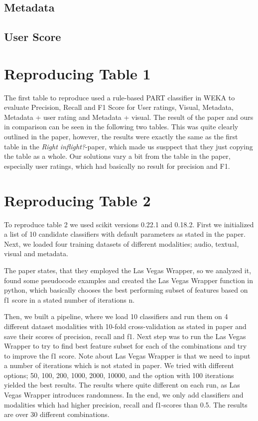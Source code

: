 \documentclass[sigconf]{acmart}
\begin{document}
\subsection{Metadata}

\subsection{User Score}

\newpage
\section{Reproducing Table 1}
The first table to reproduce used a rule-based PART classifier in WEKA to evaluate Precision, Recall and F1 Score for User ratings, Visual, Metadata, Metadata + user rating and Metadata + visual. The result of the paper and ours in comparison can be seen in the following two tables. This was quite clearly outlined in the paper, however, the results were exactly the same as the first table in the \textit{Right inflight?}-paper, which made us susppect that they just copying the table as a whole. Our solutions vary a bit from the table in the paper, especially user ratings, which had basically no result for precision and F1.


\section{Reproducing Table 2}
To reproduce table 2 we used scikit versions 0.22.1 and 0.18.2. First we initialized a list of 10 candidate classifiers with default parameters as stated in the paper. Next, we loaded four training datasets of different modalities; audio, textual, visual and metadata.

The paper states, that they employed the Las Vegas Wrapper, so we analyzed it, found some pseudocode examples and created the Las Vegas Wrapper function in python, which basically chooses the best performing subset of features based on f1 score in a stated number of iterations n.

Then, we built a pipeline, where we load 10 classifiers and run them on 4 different dataset modalities with 10-fold cross-validation as stated in paper and save their scores of precision, recall and f1. Next step was to run the Las Vegas Wrapper to try to find best feature subset for each of the combinations and try to improve the f1 score. Note about Las Vegas Wrapper is that we need to input a number of iterations which is not stated in paper. We tried with different options; 50, 100,  200, 1000, 2000, 10000, and the option with 100 iterations yielded the best results. The results where quite different on each run, as Las Vegas Wrapper introduces randomness. In the end, we only add classifiers and modalities which had higher precision, recall and f1-scores than 0.5. The results are over 30 different combinations.
\end{document}
